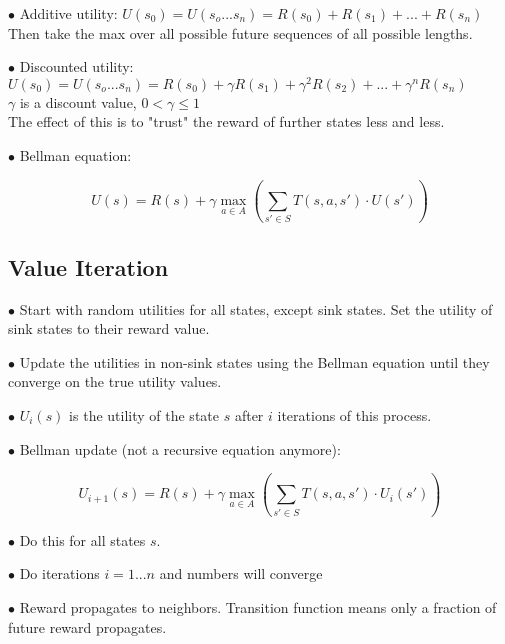 \documentclass[english,openany]{book}
\begin{document}
    $\bullet$ Additive utility: $U(s_0) = U(s_o ... s_n) = R(s_0) + R(s_1) + ... + R(s_n)$\\
    Then take the max over all possible future sequences of all possible lengths.

    $\bullet$ Discounted utility: $U(s_0) = U(s_o ... s_n) = R(s_0) + \gamma R(s_1) + \gamma^2 R(s_2) + ... + \gamma^n R(s_n)$\\
    $\gamma$ is a discount value, $0 < \gamma \leq 1$\\
    The effect of this is to "trust" the reward of further states less and less.

    $\bullet$ Bellman equation:

    $$ U(s) = R(s) + \gamma \max_{a \in A} (\sum_{s' \in S} T(s, a, s') \cdot U(s')) $$

    \subsection{Value Iteration}

    $\bullet$ Start with random utilities for all states, except sink states. Set the utility of sink states to their reward value.

    $\bullet$ Update the utilities in non-sink states using the Bellman equation until they converge on the true utility values.

    $\bullet$ $U_i (s)$ is the utility of the state $s$ after $i$ iterations of this process.

    $\bullet$ Bellman update (not a recursive equation anymore):

    $$ U_{i+1} (s) = R(s) + \gamma \max_{a \in A} (\sum_{s' \in S} T(s, a, s') \cdot U_i (s')) $$

    $\bullet$ Do this for all states $s$.

    $\bullet$ Do iterations $i = 1 ... n$ and numbers will converge

    $\bullet$ Reward propagates to neighbors. Transition function means only a fraction of future reward propagates.
\end{document}
